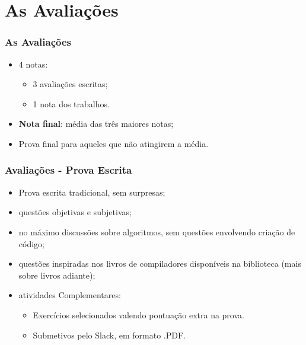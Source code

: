 \documentclass[table]{beamer}
\begin{document}
\section{As Avaliações}
\begin{frame}
   \frametitle{As Avaliações}
   \begin{itemize}
      \item 4 notas:
      \begin{itemize}
         \item 3 avaliações escritas;
	      \item 1 nota dos trabalhos.
      \end{itemize}
      \item \textbf{Nota final}: média das três maiores notas;
      \item Prova final para aqueles que não atingirem a média. 
   \end{itemize}
\end{frame}

\begin{frame}
   \frametitle{Avaliações - Prova Escrita}
   \begin{itemize}
      \item Prova escrita tradicional, sem surpresas;
      \item questões objetivas e subjetivas;
      \item no máximo discussões sobre algoritmos, sem questões envolvendo criação de código;
      \item questões inspiradas nos livros de compiladores disponíveis na biblioteca (mais sobre livros adiante);
      \item atividades Complementares:
      \begin{itemize}
          \item Exercícios selecionados valendo pontuação extra na prova.
          \item Submetivos pelo Slack, em formato .PDF. 
      \end{itemize}
   \end{itemize}
\end{frame}
\end{document}
